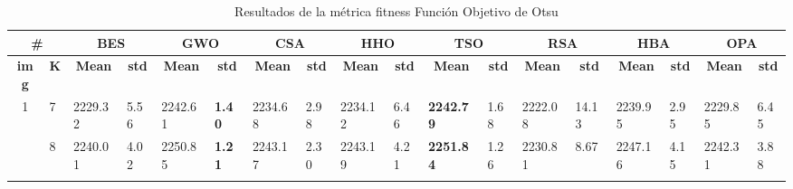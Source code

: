 \documentclass[conference]{IEEEtran}
\begin{document}
\begin{table*}[]
	\caption{Resultados de la métrica fitness Función Objetivo de Otsu}
	\begin{tabular}{
			|p{0.2cm}|p{0.2cm}| %
			p{0.8cm}|p{0.4cm}| %
			p{0.8cm}|p{0.4cm}| %
			p{0.8cm}|p{0.4cm}| %
			p{0.8cm}|p{0.4cm}| %
			p{0.8cm}|p{0.4cm}| %
			p{0.8cm}|p{0.4cm}| %
			p{0.8cm}|p{0.4cm}| %
			p{0.8cm}|p{0.4cm}| %
		}
		\hline
		\multicolumn{2}{|c|}{\textbf{\#}} & \multicolumn{2}{c|}{\textbf{BES}} & \multicolumn{2}{c|}{\textbf{GWO}} & \multicolumn{2}{c|}{\textbf{CSA}} & \multicolumn{2}{c|}{\textbf{HHO}} & \multicolumn{2}{c|}{\textbf{TSO}} & \multicolumn{2}{c|}{\textbf{RSA}} & \multicolumn{2}{c|}{\textbf{HBA}} & \multicolumn{2}{c|}{\textbf{OPA}} \\ \hline
		\multicolumn{1}{|c|}{\textbf{img}} & \multicolumn{1}{c|}{\textbf{K}} & \multicolumn{1}{c|}{\textbf{Mean}} & \multicolumn{1}{c|}{\textbf{std}} & \multicolumn{1}{c|}{\textbf{Mean}} & \multicolumn{1}{c|}{\textbf{std}} & \multicolumn{1}{c|}{\textbf{Mean}} & \multicolumn{1}{c|}{\textbf{std}} & \multicolumn{1}{c|}{\textbf{Mean}} & \multicolumn{1}{c|}{\textbf{std}} & \multicolumn{1}{c|}{\textbf{Mean}} & \multicolumn{1}{c|}{\textbf{std}} & \multicolumn{1}{c|}{\textbf{Mean}} & \multicolumn{1}{c|}{\textbf{std}} & \multicolumn{1}{c|}{\textbf{Mean}} & \multicolumn{1}{c|}{\textbf{std}} & \multicolumn{1}{c|}{\textbf{Mean}} & \multicolumn{1}{c|}{\textbf{std}} \\ \hline
		\multicolumn{1}{|c|}{\multirow{3}{*}{1}} & 7 & \multicolumn{1}{l|}{2229.32} & 5.56 & \multicolumn{1}{l|}{2242.61} & \textbf{1.40} & \multicolumn{1}{l|}{2234.68} & 2.98 & \multicolumn{1}{l|}{2234.12} & 6.46 & \multicolumn{1}{l|}{\textbf{2242.79}} & 1.68 & \multicolumn{1}{l|}{2222.08} & 14.13 & \multicolumn{1}{l|}{2239.95} & 2.95 & \multicolumn{1}{l|}{2229.85} & 6.45 \\ \cline{2-18} 
		\multicolumn{1}{|c|}{} & 8 & \multicolumn{1}{l|}{2240.01} & 4.02 & \multicolumn{1}{l|}{2250.85} & \textbf{1.21} & \multicolumn{1}{l|}{2243.17} & 2.30 & \multicolumn{1}{l|}{2243.19} & 4.21 & \multicolumn{1}{l|}{\textbf{2251.84}} & 1.26 & \multicolumn{1}{l|}{2230.81} & 8.67 & \multicolumn{1}{l|}{2247.16} & 4.15 & \multicolumn{1}{l|}{2242.31} & 3.88 \\ \cline{2-18} 

\end{tabular}
\end{table*}
\end{document}
